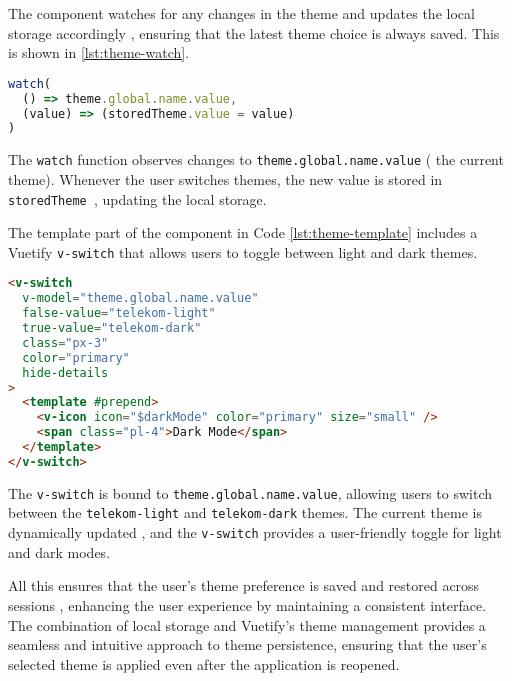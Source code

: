 The component watches for any changes in the theme and updates the local storage accordingly
, ensuring that the latest theme choice is always saved. This is shown in \ref{lst:theme-watch}.

\begin{lstlisting}[language=JavaScript, caption={Watching for Theme Changes (\texttt{ThemeSwitcher.vue})},
  firstnumber=11,label={lst:theme-watch}]
watch(
  () => theme.global.name.value,
  (value) => (storedTheme.value = value)
)
\end{lstlisting}

The \texttt{watch} function observes changes to \texttt{theme.global.name.value} (
the current theme). Whenever the user switches themes, the new value is stored in \texttt{storedTheme
}, updating the local storage.

The template part of the component in Code \ref{lst:theme-template} includes a Vuetify \texttt{v-switch} that
allows users to toggle between light and dark themes.

\begin{lstlisting}[language=HTML, caption={Template for Theme Toggle (\texttt{ThemeSwitcher.vue})},
  firstnumber=18,label={lst:theme-template}]
<v-switch
  v-model="theme.global.name.value"
  false-value="telekom-light"
  true-value="telekom-dark"
  class="px-3"
  color="primary"
  hide-details
>
  <template #prepend>
    <v-icon icon="$darkMode" color="primary" size="small" />
    <span class="pl-4">Dark Mode</span>
  </template>
</v-switch>
\end{lstlisting}

The \texttt{v-switch} is bound to \texttt{theme.global.name.value}, allowing users
to switch between the \texttt{telekom-light} and \texttt{telekom-dark} themes. The current theme is dynamically updated
, and the \texttt{v-switch} provides a user-friendly toggle for light and dark modes.

All this ensures that the user’s theme preference is saved and restored across sessions
, enhancing the user experience by maintaining a consistent interface.
The combination of local storage and Vuetify’s theme management provides
a seamless and intuitive approach to theme persistence, ensuring
that the user’s selected theme is applied even after the application is reopened.
